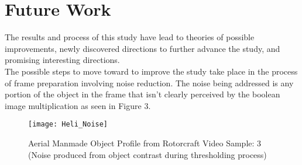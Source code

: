 \section{Future Work}
\indent The results and process of this study have lead to theories of possible improvements, newly discovered directions to further advance the study, and promising interesting directions.\\
\indent The possible steps to move toward to improve the study take place in the process of frame preparation involving noise reduction. The noise being addressed is any portion of the object in the frame that isn't clearly perceived by the boolean image 
multiplication as seen in Figure 3. 

\begin{figure}[ht]
	\center 
	\texttt{[image: Heli\_Noise]}
	\caption[Noisy Aerial Manmade Object Profile]{Aerial Manmade Object Profile from Rotorcraft Video Sample: 3 (Noise produced from object contrast during thresholding process)}
\end{figure}

